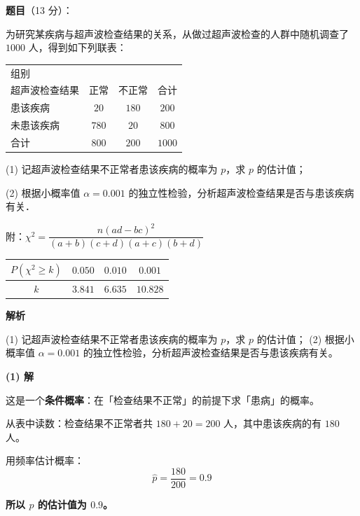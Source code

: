 \begin{answer}

\textbf{题目}（13 分）：

为研究某疾病与超声波检查结果的关系，从做过超声波检查的人群中随机调查了 $1000$ 人，得到如下列联表：

\begin{center}
\begin{tabular}{lccc}
\toprule
组别 \\ 超声波检查结果 & 正常 & 不正常 & 合计 \\
\midrule
患该疾病 & $20$ & $180$ & $200$ \\
未患该疾病 & $780$ & $20$ & $800$ \\
合计 & $800$ & $200$ & $1000$ \\
\bottomrule
\end{tabular}
\end{center}

  (1) 记超声波检查结果不正常者患该疾病的概率为 $p$，求 $p$ 的估计值；

  (2) 根据小概率值 $\alpha=0.001$ 的独立性检验，分析超声波检查结果是否与患该疾病有关．

  附：$\chi^2=\dfrac{n(ad-bc)^2}{(a+b)(c+d)(a+c)(b+d)}$

\begin{center}
\begin{tabular}{cccc}
\toprule
$P(\chi^2\ge k)$ & $0.050$ & $0.010$ & $0.001$ \\
\midrule
$k$ & $3.841$ & $6.635$ & $10.828$ \\
\bottomrule
\end{tabular}
\end{center}

\textbf{解析}

  (1) 记超声波检查结果不正常者患该疾病的概率为 $p$，求 $p$ 的估计值；
  (2) 根据小概率值 $\alpha=0.001$ 的独立性检验，分析超声波检查结果是否与患该疾病有关。

\par\medskip

\textbf{(1) 解}

这是一个\textbf{条件概率}：在「检查结果不正常」的前提下求「患病」的概率。

从表中读数：检查结果不正常者共 $180+20=200$ 人，其中患该疾病的有 $180$ 人。

用频率估计概率：
\nopagebreak[4]
\[\hat p=\frac{180}{200}=0.9\]

\textbf{所以 $p$ 的估计值为 $0.9$。}


\end{answer}

